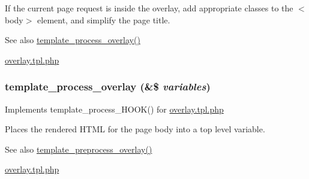 If the current page request is inside the overlay, add appropriate classes to the $<$body$>$ element, and simplify the page title.

\begin{DoxySeeAlso}{See also}
\hyperlink{overlay_8module_af403d52da9cddcf63a30aa53bb813ee1}{template\_\-process\_\-overlay()} 

\hyperlink{overlay_8tpl_8php}{overlay.tpl.php} 
\end{DoxySeeAlso}
\hypertarget{overlay_8module_af403d52da9cddcf63a30aa53bb813ee1}{
\subsubsection[{template\_\-process\_\-overlay}]{\setlength{\rightskip}{0pt plus 5cm}template\_\-process\_\-overlay (\&\$ {\em variables})}}
\label{overlay_8module_af403d52da9cddcf63a30aa53bb813ee1}
Implements template\_\-process\_\-HOOK() for \hyperlink{overlay_8tpl_8php}{overlay.tpl.php}

Places the rendered HTML for the page body into a top level variable.

\begin{DoxySeeAlso}{See also}
\hyperlink{overlay_8module_a490f0cf3842ad8381b483be8ec42a153}{template\_\-preprocess\_\-overlay()} 

\hyperlink{overlay_8tpl_8php}{overlay.tpl.php} 
\end{DoxySeeAlso}
